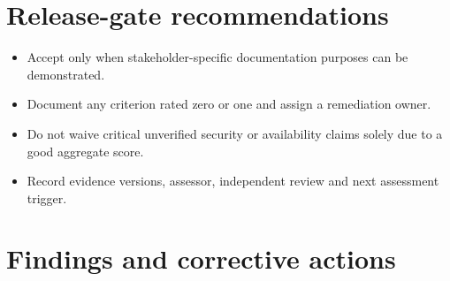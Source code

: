 \documentclass[10pt,letterpaper]{article}
\begin{document}
\section{Release-gate recommendations}
\begin{itemize}
\item Accept only when stakeholder-specific documentation purposes can be demonstrated.
\item Document any criterion rated zero or one and assign a remediation owner.
\item Do not waive critical unverified security or availability claims solely due to a good aggregate score.
\item Record evidence versions, assessor, independent review and next assessment trigger.
\end{itemize}
\section{Findings and corrective actions}
\end{document}
